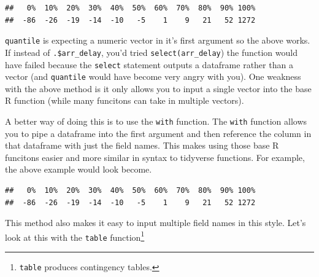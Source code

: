 \documentclass[]{book}
\newenvironment{Shaded}{\begin{snugshade}}{\end{snugshade}}
\newcommand{\DataTypeTok}[1]{\textcolor[rgb]{0.13,0.29,0.53}{#1}}
\newcommand{\DecValTok}[1]{\textcolor[rgb]{0.00,0.00,0.81}{#1}}
\newcommand{\FloatTok}[1]{\textcolor[rgb]{0.00,0.00,0.81}{#1}}
\newcommand{\KeywordTok}[1]{\textcolor[rgb]{0.13,0.29,0.53}{\textbf{#1}}}
\newcommand{\NormalTok}[1]{#1}
\newcommand{\OperatorTok}[1]{\textcolor[rgb]{0.81,0.36,0.00}{\textbf{#1}}}
\newcommand{\StringTok}[1]{\textcolor[rgb]{0.31,0.60,0.02}{#1}}
\let\rmarkdownfootnote\footnote%
\def\footnote{\protect\rmarkdownfootnote}
\theoremstyle{definition}
\theoremstyle{definition}
\theoremstyle{definition}
\theoremstyle{remark}
\begin{document}
\begin{verbatim}
##   0%  10%  20%  30%  40%  50%  60%  70%  80%  90% 100% 
##  -86  -26  -19  -14  -10   -5    1    9   21   52 1272
\end{verbatim}

\texttt{quantile} is expecting a numeric vector in it's first argument
so the above works. If instead of \texttt{.\$arr\_delay}, you'd tried
\texttt{select(arr\_delay}) the function would have failed because the
\texttt{select} statement outputs a dataframe rather than a vector (and
\texttt{quantile} would have become very angry with you). One weakness
with the above method is it only allows you to input a single vector
into the base R function (while many funcitons can take in multiple
vectors).

A better way of doing this is to use the \texttt{with} function. The
\texttt{with} function allows you to pipe a dataframe into the first
argument and then reference the column in that dataframe with just the
field names. This makes using those base R funcitons easier and more
similar in syntax to tidyverse functions. For example, the above example
would look become.

\begin{Shaded}
\end{Shaded}

\begin{verbatim}
##   0%  10%  20%  30%  40%  50%  60%  70%  80%  90% 100% 
##  -86  -26  -19  -14  -10   -5    1    9   21   52 1272
\end{verbatim}

This method also makes it easy to input multiple field names in this
style. Let's look at this with the \texttt{table} function\footnote{\texttt{table}
  produces contingency tables.}

\begin{Shaded}
\end{Shaded}
\end{document}
